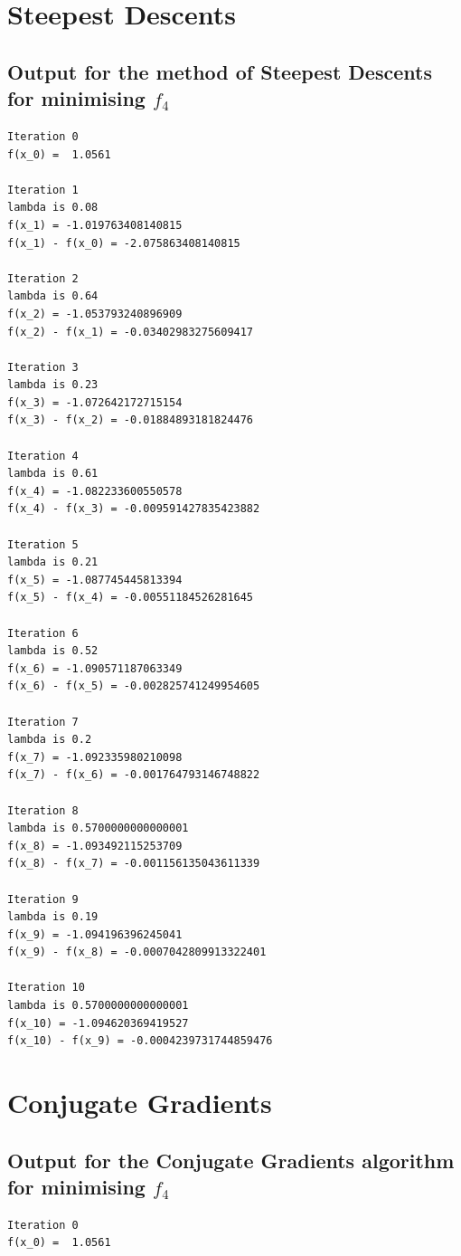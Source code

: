 \documentclass[11pt]{article} %
\begin{document}
\clearpage
\begin{appendices}
\section{Steepest Descents}
\subsection{Output for the method of Steepest Descents for minimising $f_4$}
\label{app:SD_out_1}
\begin{verbatim}
Iteration 0
f(x_0) =  1.0561
 
Iteration 1
lambda is 0.08
f(x_1) = -1.019763408140815
f(x_1) - f(x_0) = -2.075863408140815
 
Iteration 2
lambda is 0.64
f(x_2) = -1.053793240896909
f(x_2) - f(x_1) = -0.03402983275609417
 
Iteration 3
lambda is 0.23
f(x_3) = -1.072642172715154
f(x_3) - f(x_2) = -0.01884893181824476
 
Iteration 4
lambda is 0.61
f(x_4) = -1.082233600550578
f(x_4) - f(x_3) = -0.009591427835423882
 
Iteration 5
lambda is 0.21
f(x_5) = -1.087745445813394
f(x_5) - f(x_4) = -0.00551184526281645
 
Iteration 6
lambda is 0.52
f(x_6) = -1.090571187063349
f(x_6) - f(x_5) = -0.002825741249954605
 
Iteration 7
lambda is 0.2
f(x_7) = -1.092335980210098
f(x_7) - f(x_6) = -0.001764793146748822
 
Iteration 8
lambda is 0.5700000000000001
f(x_8) = -1.093492115253709
f(x_8) - f(x_7) = -0.001156135043611339
 
Iteration 9
lambda is 0.19
f(x_9) = -1.094196396245041
f(x_9) - f(x_8) = -0.0007042809913322401
 
Iteration 10
lambda is 0.5700000000000001
f(x_10) = -1.094620369419527
f(x_10) - f(x_9) = -0.0004239731744859476
\end{verbatim}

\section{Conjugate Gradients}
\subsection{Output for the Conjugate Gradients algorithm for minimising $f_4$}
\label{app:CG_out_1}
\begin{verbatim}
Iteration 0
f(x_0) =  1.0561
 

\end{verbatim}
\end{appendices}
\end{document}
